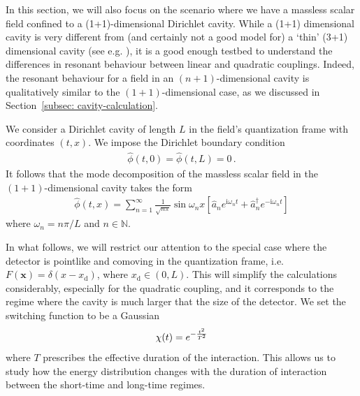 \documentclass[11pt,prd,onecolumn,superscriptaddress,nofootinbib,floatfix,amsmath,amssymb]{revtex4-2}
\newcommand{\ii}{\mathrm{i}}
\newcommand{\bx}{\bm{x}}
\begin{document}
    In this section, we will also focus on the scenario where we have a massless scalar field confined to a (1+1)-dimensional Dirichlet cavity. While a (1+1) dimensional cavity is very different from (and certainly not a good model for) a `thin' (3+1) dimensional cavity (see e.g. \cite{Lopp:2018cavity}), it is a good enough testbed to understand the differences in resonant behaviour between linear and quadratic couplings. Indeed, the resonant behaviour for a field in an $(n+1)$-dimensional cavity is qualitatively similar to the $(1+1)$-dimensional case, as we discussed in Section~\ref{subsec: cavity-calculation}.
    
    We consider a Dirichlet cavity of length $L$ in the field's quantization frame with coordinates $(t,x)$. We impose the Dirichlet boundary condition 
    \begin{align}
        \hat\phi(t,0) = \hat\phi(t,L) = 0\,.    
    \end{align}
    It follows that the mode decomposition of the massless scalar field in  the $(1+1)$-dimensional cavity takes the form
    \begin{align}
        \hat\phi(t,x) = \sum_{n=1}^\infty \frac{1}{\sqrt{n\pi}}\sin\omega_n x\left[\hat a_{n}e^{\ii\omega_n t} + \hat a^\dagger_{n}e^{-\ii\omega_n t}\right]
        \label{eq: mode-decomposition-cavity-1D}
    \end{align}
    where $\omega_n = n\pi /L$ and $n\in \mathbb{N}$. 
    
    In what follows, we will restrict our attention to the special case where the detector is pointlike and comoving in the quantization frame, i.e. $F(\bx)=\delta(x-x_\text{d})$, where $x_\text{d}\in (0,L)$. This will simplify the calculations considerably, especially for the quadratic coupling, and it corresponds to the regime where the cavity is much larger that the size of the detector. We set the switching function to be a Gaussian \begin{equation}
    \chi(t)=e^{-\frac{t^2}{T^2}}\notag
    \end{equation} where $T$ prescribes the effective duration of the interaction. This allows us to study how the energy distribution changes with the duration of interaction between the short-time and long-time regimes.
    
    
    
    
    
    
    
    
    
    
    
\end{document}
